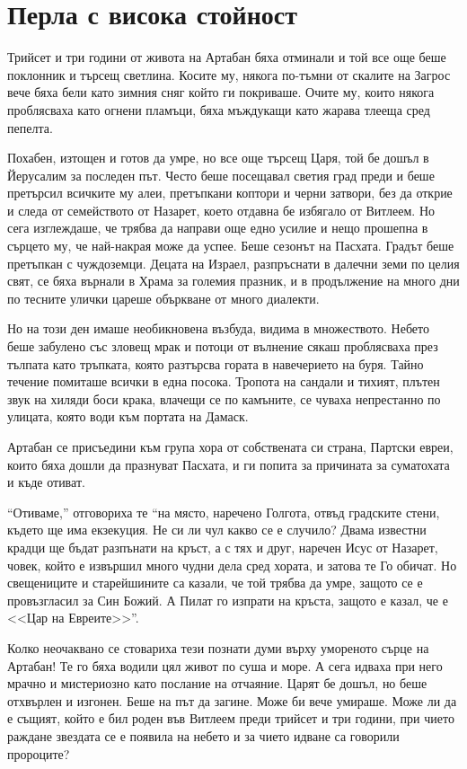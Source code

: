 \documentclass[oneside,10pt]{memoir}
\begin{document}
\part{Перла с висока стойност}

Трийсет и три години от живота на Артабан бяха отминали и той все още беше
поклонник и търсещ светлина. Косите му, някога по-тъмни от скалите на Загрос
вече бяха бели като зимния сняг който ги покриваше. Очите му, които някога
проблясваха като огнени пламъци, бяха мъждукащи като жарава тлееща сред пепелта.

Похабен, изтощен и готов да умре, но все още търсещ Царя, той бе дошъл в
Йерусалим за последен път. Често беше посещавал светия град преди и беше
претърсил всичките му алеи, претъпкани коптори и черни затвори, без да открие и
следа от семейството от Назарет, което отдавна бе избягало от Витлеем. Но сега
изглеждаше, че трябва да направи още едно усилие и нещо прошепна в сърцето му,
че най-накрая може да успее. Беше сезонът на Пасхата. Градът беше претъпкан с
чуждоземци. Децата на Израел, разпръснати в далечни земи по целия свят, се бяха
върнали в Храма за големия празник, и в продължение на много дни по тесните
улички цареше объркване от много диалекти.

Но на този ден имаше необикновена възбуда, видима в множеството. Небето беше
забулено със зловещ мрак и потоци от вълнение сякаш проблясваха през тълпата
като тръпката, която разтърсва гората в навечерието на буря. Тайно течение
помиташе всички в една посока. Тропота на сандали и тихият, плътен звук на
хиляди боси крака, влачещи се по камъните, се чуваха непрестанно по улицата,
която води към портата на Дамаск.

Артабан се присъедини към група хора от собствената си страна, Партски евреи,
които бяха дошли да празнуват Пасхата, и ги попита за причината за суматохата
и къде отиват.

``Отиваме,'' отговориха те ``на място, наречено Голгота, отвъд градските стени,
където ще има екзекуция. Не си ли чул какво се е случило? Двама известни крадци
ще бъдат разпънати на кръст, а с тях и друг, наречен Исус от Назарет, човек,
който е извършил много чудни дела сред хората, и затова те Го обичат. Но
свещениците и старейшините са казали, че той трябва да умре, защото се е
провъзгласил за Син Божий. А Пилат го изпрати на кръста, защото е казал, че е
<<Цар на Евреите>>''.

Колко неочаквано се стовариха тези познати думи върху умореното сърце на
Артабан! Те го бяха водили цял живот по суша и море. А сега идваха при него
мрачно и мистериозно като послание на отчаяние. Царят бе дошъл, но беше
отхвърлен и изгонен. Беше на път да загине. Може би вече умираше. Може ли да е
същият, който е бил роден във Витлеем преди трийсет и три години, при чието
раждане звездата се е появила на небето и за чието идване са говорили пророците?
\end{document}
